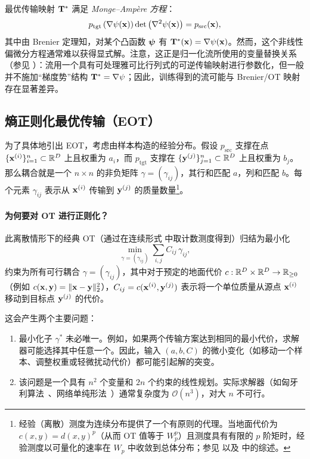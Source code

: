 最优传输映射 ${\mathbf{T}}^*$ 满足 \emph{Monge–Ampère 方程}：
\begin{equation}\label{eq:monge-ampere}
    p_{\mathrm{tgt}}\left(\nabla \psi({\mathbf{x}})\right) \det\left(\nabla^2 \psi({\mathbf{x}})\right) = p_{\mathrm{src}}({\mathbf{x}}),
\end{equation}
其中由 Brenier 定理知，对某个凸函数 ${\bm{\psi}}$ 有 ${\mathbf{T}}^*({\mathbf{x}}) = \nabla \psi({\mathbf{x}})$。然而，这个非线性偏微分方程通常难以获得显式解。注意，这正是归一化流所使用的变量替换关系（参见 ）：流用一个具有可处理雅可比行列式的可逆传输映射进行参数化，但一般并不施加“梯度势”结构 ${\mathbf{T}}^*=\nabla\psi$；因此，训练得到的流可能与 Brenier/OT 映射存在显著差异。




\subsection{熵正则化最优传输（EOT）}

为了具体地引出 EOT，考虑由样本构造的经验分布。假设 $p_{\mathrm{src}}$ 支撑在点 $\{{\mathbf{x}}^{(i)}\}_{i=1}^n \subset \mathbb{R}^D$ 上且权重为 $a_i$，而 $p_{\mathrm{tgt}}$ 支撑在 $\{{\mathbf{y}}^{(j)}\}_{j=1}^n \subset \mathbb{R}^D$ 上且权重为 $b_j$。那么耦合就是一个 $n\times n$ 的非负矩阵 $\gamma=(\gamma_{ij})$，其行和匹配 $a$，列和匹配 $b$。每个元素 $\gamma_{ij}$ 表示从 ${\mathbf{x}}^{(i)}$ 传输到 ${\mathbf{y}}^{(j)}$ 的质量数量\footnote{经验（离散）测度为连续分布提供了一个有原则的代理。当地面代价为 $c(x,y)=d(x,y)^p$（从而 OT 值等于 $W_p^p$）且测度具有有限的 $p$ 阶矩时，经验测度以可量化的速率在 $W_p$ 中收敛到总体分布；参见 \citet{fournier2015rate} 以及 \citet{peyre2019computational} 中的综述。}。

\paragraph{为何要对 OT 进行正则化？}
此离散情形下的经典 OT（通过在连续形式  中取计数测度得到）归结为最小化
\[
\min_{\gamma=(\gamma_{ij})}\sum_{i,j} C_{ij}\,\gamma_{ij},
\]
约束为所有可行耦合 $\gamma=(\gamma_{ij})$，其中对于预定的地面代价 $c:\mathbb{R}^D\times\mathbb{R}^D\to\mathbb{R}_{\ge 0}$（例如 $c({\mathbf{x}},{\mathbf{y}})=\|{\mathbf{x}}-{\mathbf{y}}\|_2^2$），$C_{ij} = c({\mathbf{x}}^{(i)},{\mathbf{y}}^{(j)})$ 表示将一个单位质量从源点 ${\mathbf{x}}^{(i)}$ 移动到目标点 ${\mathbf{y}}^{(j)}$ 的代价。

这会产生两个主要问题：
\begin{enumerate}
    \item {} 最小化子 $\gamma^*$ 未必唯一。例如，如果两个传输方案达到相同的最小代价，求解器可能选择其中任意一个。因此，输入 $(a,b,C)$ 的微小变化（如移动一个样本、调整权重或轻微扰动代价）都可能引起解的突变。  
    \item {} 该问题是一个具有 $n^2$ 个变量和 $2n$ 个约束的线性规划。实际求解器（如匈牙利算法~\citep{kuhn1955hungarian,munkres1957algorithms}、网络单纯形法~\citep{peyre2019computational}）通常复杂度为 $\mathcal{O}(n^3)$，对大 $n$ 不可行。
\end{enumerate}

